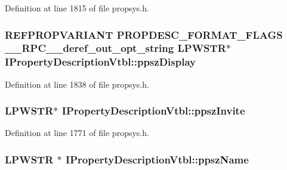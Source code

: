 Definition at line 1815 of file propsys.\+h.

\subsubsection[{\texorpdfstring{ppsz\+Display}{ppszDisplay}}]{ {\bf R\+E\+F\+P\+R\+O\+P\+V\+A\+R\+I\+A\+NT} {\bf P\+R\+O\+P\+D\+E\+S\+C\+\_\+\+F\+O\+R\+M\+A\+T\+\_\+\+F\+L\+A\+GS} {\bf \+\_\+\+\_\+\+R\+P\+C\+\_\+\+\_\+deref\+\_\+out\+\_\+opt\+\_\+string} {\bf L\+P\+W\+S\+TR}$\ast$ I\+Property\+Description\+Vtbl\+::ppsz\+Display}\hypertarget{struct_i_property_description_vtbl_abc7d91025bb59958ac0ffa00b0442f7d}{}\label{struct_i_property_description_vtbl_abc7d91025bb59958ac0ffa00b0442f7d}


Definition at line 1838 of file propsys.\+h.

\subsubsection[{\texorpdfstring{ppsz\+Invite}{ppszInvite}}]{ {\bf L\+P\+W\+S\+TR}$\ast$ I\+Property\+Description\+Vtbl\+::ppsz\+Invite}\hypertarget{struct_i_property_description_vtbl_a1cfec52c4eb20c70a7830f2e2759823e}{}\label{struct_i_property_description_vtbl_a1cfec52c4eb20c70a7830f2e2759823e}


Definition at line 1771 of file propsys.\+h.

\subsubsection[{\texorpdfstring{ppsz\+Name}{ppszName}}]{ {\bf L\+P\+W\+S\+TR} $\ast$ I\+Property\+Description\+Vtbl\+::ppsz\+Name}\hypertarget{struct_i_property_description_vtbl_ae63729497de6c0d2f93cdf60a7b24f3c}{}\label{struct_i_property_description_vtbl_ae63729497de6c0d2f93cdf60a7b24f3c}


